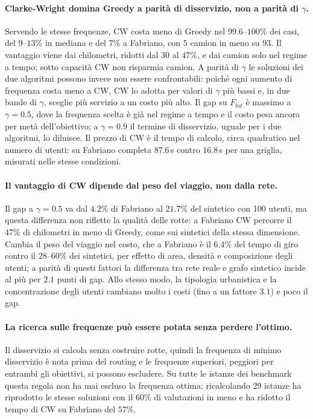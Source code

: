 \paragraph{Clarke-Wright domina Greedy a parità di disservizio, non a parità di $\gamma$.}
Servendo le stesse frequenze, CW costa meno di Greedy nel $99.6$--$100\%$ dei casi, del $9$--$13\%$ in mediana e del $7\%$ a Fabriano, con $5$ camion in meno su $93$. Il vantaggio viene dai chilometri, ridotti dal $30$ al $47\%$, e dai camion solo nel regime a tempo; sotto capacità CW non risparmia camion. A parità di $\gamma$ le soluzioni dei due algoritmi possono invece non essere confrontabili: poiché ogni aumento di frequenza costa meno a CW, CW lo adotta per valori di $\gamma$ più bassi e, in due bande di $\gamma$, sceglie più servizio a un costo più alto. Il gap su $F_{tot}$ è massimo a $\gamma=0.5$, dove la frequenza scelta è già nel regime a tempo e il costo pesa ancora per metà dell'obiettivo; a $\gamma=0.9$ il termine di disservizio, uguale per i due algoritmi, lo diluisce. Il prezzo di CW è il tempo di calcolo, circa quadratico nel numero di utenti: su Fabriano completa $87.6$\,s contro $16.8$\,s per una griglia, misurati nelle stesse condizioni.

\paragraph{Il vantaggio di CW dipende dal peso del viaggio, non dalla rete.}
Il gap a $\gamma=0.5$ va dal $4.2\%$ di Fabriano al $21.7\%$ del sintetico con 100 utenti, ma questa differenza non riflette la qualità delle rotte: a Fabriano CW percorre il $47\%$ di chilometri in meno di Greedy, come sui sintetici della stessa dimensione. Cambia il peso del viaggio nel costo, che a Fabriano è il $6.4\%$ del tempo di giro contro il $28$--$60\%$ dei sintetici, per effetto di area, densità e composizione degli utenti; a parità di questi fattori la differenza tra rete reale e grafo sintetico incide al più per $2.1$ punti di gap. Allo stesso modo, la tipologia urbanistica e la concentrazione degli utenti cambiano molto i costi (fino a un fattore $3.1$) e poco il gap.

\paragraph{La ricerca sulle frequenze può essere potata senza perdere l'ottimo.}
Il disservizio si calcola senza costruire rotte, quindi la frequenza di minimo disservizio è nota prima del routing e le frequenze superiori, peggiori per entrambi gli obiettivi, si possono escludere. Su tutte le istanze dei benchmark questa regola non ha mai escluso la frequenza ottima; ricalcolando 29 istanze ha riprodotto le stesse soluzioni con il $60\%$ di valutazioni in meno e ha ridotto il tempo di CW su Fabriano del $57\%$.

